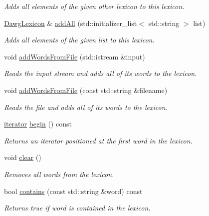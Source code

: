 \begin{DoxyCompactItemize}
\begin{DoxyCompactList}\small\item\em Adds all elements of the given other lexicon to this lexicon. \end{DoxyCompactList}\item 
\mbox{\hyperlink{classDawgLexicon}{Dawg\+Lexicon}} \& \mbox{\hyperlink{classDawgLexicon_a3f7e696b6fee0d99db3f27619aa559b9}{add\+All}} (std\+::initializer\+\_\+list$<$ std\+::string $>$ list)
\begin{DoxyCompactList}\small\item\em Adds all elements of the given list to this lexicon. \end{DoxyCompactList}\item 
void \mbox{\hyperlink{classDawgLexicon_a215fcead487aace2e89b04863e326ba6}{add\+Words\+From\+File}} (std\+::istream \&input)
\begin{DoxyCompactList}\small\item\em Reads the input stream and adds all of its words to the lexicon. \end{DoxyCompactList}\item 
void \mbox{\hyperlink{classDawgLexicon_a3891deaa85aee9a52b6ca258d1514716}{add\+Words\+From\+File}} (const std\+::string \&filename)
\begin{DoxyCompactList}\small\item\em Reads the file and adds all of its words to the lexicon. \end{DoxyCompactList}\item 
\mbox{\hyperlink{classDawgLexicon_1_1iterator}{iterator}} \mbox{\hyperlink{classDawgLexicon_a0c62c15c8ed609e7e5e9518cf5f5c712}{begin}} () const
\begin{DoxyCompactList}\small\item\em Returns an iterator positioned at the first word in the lexicon. \end{DoxyCompactList}\item 
void \mbox{\hyperlink{classDawgLexicon_ac8bb3912a3ce86b15842e79d0b421204}{clear}} ()
\begin{DoxyCompactList}\small\item\em Removes all words from the lexicon. \end{DoxyCompactList}\item 
bool \mbox{\hyperlink{classDawgLexicon_a479b1bac4a3c243907c80e5c6f9b05d5}{contains}} (const std\+::string \&word) const
\begin{DoxyCompactList}\small\item\em Returns {\ttfamily true} if {\ttfamily word} is contained in the lexicon. \end{DoxyCompactList}\item 

\end{DoxyCompactItemize}
